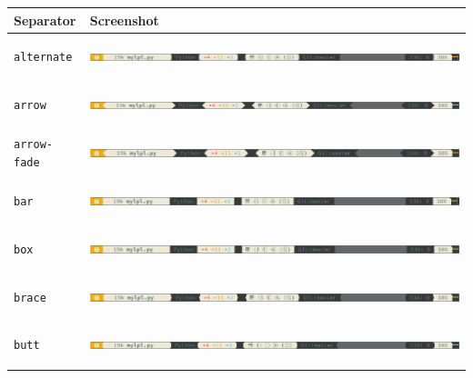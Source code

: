 \documentclass[11pt]{article}
\begin{document}
\begin{enumerate}
\begin{center}
\begin{tabular}{ll}
Separator & Screenshot\\
\hline
\texttt{alternate} & \begin{center}
\includegraphics[width=.9\linewidth]{img/powerline-alternate.png}
\end{center}\\
\texttt{arrow} & \begin{center}
\includegraphics[width=.9\linewidth]{img/powerline-arrow.png}
\end{center}\\
\texttt{arrow-fade} & \begin{center}
\includegraphics[width=.9\linewidth]{img/powerline-arrow-fade.png}
\end{center}\\
\texttt{bar} & \begin{center}
\includegraphics[width=.9\linewidth]{img/powerline-bar.png}
\end{center}\\
\texttt{box} & \begin{center}
\includegraphics[width=.9\linewidth]{img/powerline-box.png}
\end{center}\\
\texttt{brace} & \begin{center}
\includegraphics[width=.9\linewidth]{img/powerline-brace.png}
\end{center}\\
\texttt{butt} & \begin{center}
\includegraphics[width=.9\linewidth]{img/powerline-butt.png}
\end{center}\\

\end{tabular}
\end{center}
\end{enumerate}
\end{document}
